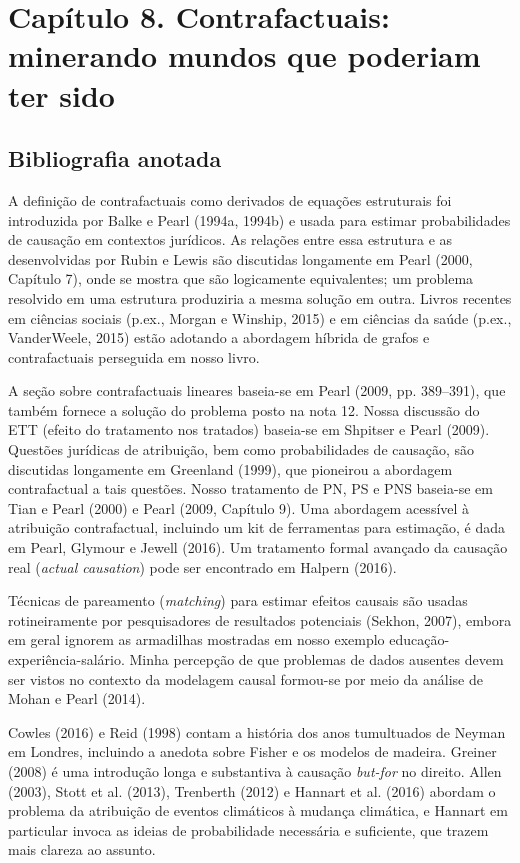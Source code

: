 \documentclass[11pt,a5paper,twoside]{book}
\begin{document}
\section{Capítulo 8. Contrafactuais: minerando mundos que poderiam ter sido}
\subsection{Bibliografia anotada}
A definição de contrafactuais como derivados de equações estruturais foi introduzida por Balke e Pearl (1994a, 1994b) e usada para estimar probabilidades de causação em contextos jurídicos. As relações entre essa estrutura e as desenvolvidas por Rubin e Lewis são discutidas longamente em Pearl (2000, Capítulo 7), onde se mostra que são logicamente equivalentes; um problema resolvido em uma estrutura produziria a mesma solução em outra. Livros recentes em ciências sociais (p.ex., Morgan e Winship, 2015) e em ciências da saúde (p.ex., VanderWeele, 2015) estão adotando a abordagem híbrida de grafos e contrafactuais perseguida em nosso livro.

A seção sobre contrafactuais lineares baseia-se em Pearl (2009, pp. 389–391), que também fornece a solução do problema posto na nota 12. Nossa discussão do ETT (efeito do tratamento nos tratados) baseia-se em Shpitser e Pearl (2009). Questões jurídicas de atribuição, bem como probabilidades de causação, são discutidas longamente em Greenland (1999), que pioneirou a abordagem contrafactual a tais questões. Nosso tratamento de PN, PS e PNS baseia-se em Tian e Pearl (2000) e Pearl (2009, Capítulo 9). Uma abordagem acessível à atribuição contrafactual, incluindo um kit de ferramentas para estimação, é dada em Pearl, Glymour e Jewell (2016). Um tratamento formal avançado da causação real (\textit{actual causation}) pode ser encontrado em Halpern (2016).

Técnicas de pareamento (\textit{matching}) para estimar efeitos causais são usadas rotineiramente por pesquisadores de resultados potenciais (Sekhon, 2007), embora em geral ignorem as armadilhas mostradas em nosso exemplo educação-experiência-salário. Minha percepção de que problemas de dados ausentes devem ser vistos no contexto da modelagem causal formou-se por meio da análise de Mohan e Pearl (2014).

Cowles (2016) e Reid (1998) contam a história dos anos tumultuados de Neyman em Londres, incluindo a anedota sobre Fisher e os modelos de madeira. Greiner (2008) é uma introdução longa e substantiva à causação \textit{but-for} no direito. Allen (2003), Stott et al. (2013), Trenberth (2012) e Hannart et al. (2016) abordam o problema da atribuição de eventos climáticos à mudança climática, e Hannart em particular invoca as ideias de probabilidade necessária e suficiente, que trazem mais clareza ao assunto.
\end{document}
